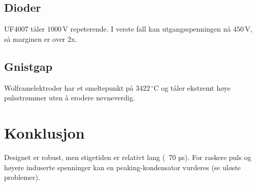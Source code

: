 \documentclass{article}
\begin{document}
\subsection{Dioder}
UF4007 tåler $1000\,\text{V}$ repeterende. I verste fall kan utgangsspenningen nå $450\,\text{V}$, så marginen er over 2x.

\subsection{Gnistgap}
Wolframelektroder har et smeltepunkt på $3422\,^{\circ}\text{C}$ og tåler ekstremt høye pulsstrømmer uten å erodere nevneverdig.

\section{Konklusjon}
Designet er robust, men stigetiden er relativt lang (~70 µs). For raskere puls og høyere induserte spenninger kan en peaking-kondensator vurderes (se uløste problemer).
\end{document}
